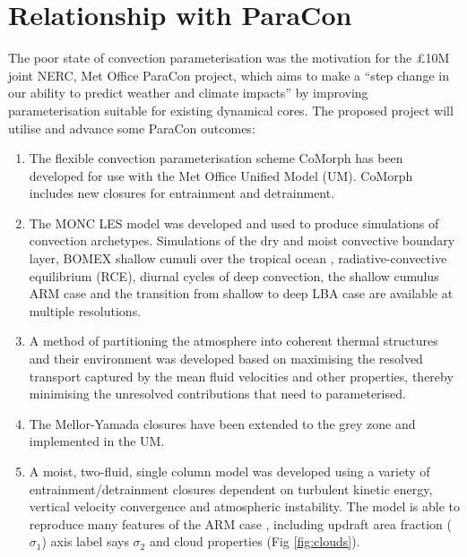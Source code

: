 \documentclass[11pt,a4paper]{article}
\begin{document}
\section{Relationship with ParaCon}

The poor state of convection parameterisation was the motivation for the \pounds 10M joint NERC, Met Office ParaCon project, which aims to make a ``step change in our ability to predict weather and climate impacts'' by improving parameterisation suitable for existing dynamical cores. The proposed project will utilise and advance some ParaCon outcomes:
\begin{enumerate}
\item The flexible convection parameterisation scheme CoMorph has been developed for use with the Met Office Unified Model (UM). CoMorph includes new closures for entrainment and detrainment.

\item The MONC LES model was developed and used to produce simulations of convection archetypes. Simulations of the dry and moist convective boundary layer, BOMEX shallow cumuli over the tropical ocean \cite[]{HR73}, radiative-convective equilibrium (RCE), diurnal cycles of deep convection, the shallow cumulus ARM case \cite[]{BCC+02} and the transition from shallow to deep LBA case \cite[]{BFGB02} are available at multiple resolutions.

\item A method of partitioning the atmosphere into coherent thermal structures and their environment was developed \cite[]{ETB20} based on maximising the resolved transport captured by the mean fluid velocities and other properties, thereby minimising the unresolved contributions that need to parameterised.

\item The Mellor-Yamada closures have been extended to the grey zone and implemented in the UM.

\item A moist, two-fluid, single column model was developed using a variety of entrainment/detrainment closures dependent on turbulent kinetic energy, vertical velocity convergence and atmospheric instability. The model is able to reproduce many features of the ARM case \cite[]{BCC+02}, including updraft area fraction ($\sigma_1$) {\color{red} axis label says $\sigma_2$} and cloud properties (Fig \ref{fig:clouds}). 


\end{enumerate}
\end{document}
